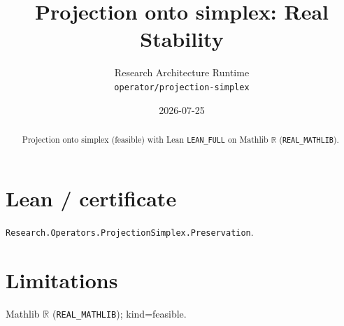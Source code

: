 \documentclass[11pt]{article}
\title{Projection onto simplex: Real Stability}
\author{Research Architecture Runtime \\ \texttt{operator/projection-simplex}}
\date{2026-07-25}
\begin{document}
\maketitle
\begin{abstract}
Projection onto simplex (feasible) with Lean \texttt{LEAN\_FULL} on Mathlib $\mathbb{R}$ (\texttt{REAL\_MATHLIB}).
\end{abstract}
\section{Lean / certificate}
\texttt{Research.Operators.ProjectionSimplex.Preservation}.
\section{Limitations}
Mathlib $\mathbb{R}$ (\texttt{REAL\_MATHLIB}); kind=feasible.
\end{document}
